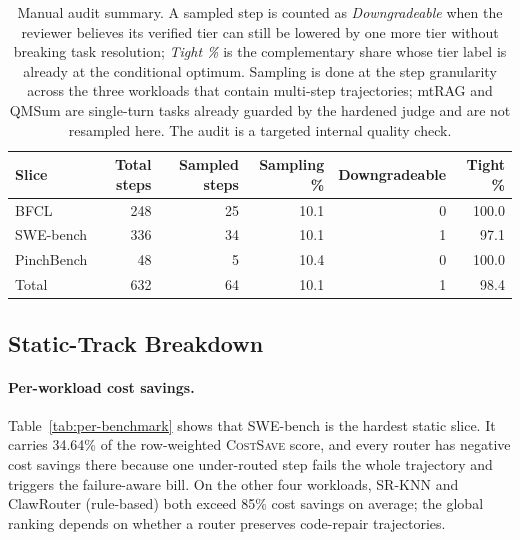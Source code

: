 \begin{table}[ht]
\centering
\small
\caption{Manual audit summary. A sampled step is counted as
\emph{Downgradeable} when the reviewer believes its verified tier can still
be lowered by one more tier without breaking task resolution; \emph{Tight \%}
is the complementary share whose tier label is already at the conditional
optimum. Sampling is done at the step granularity across the three workloads
that contain multi-step trajectories; mtRAG and QMSum are single-turn tasks
already guarded by the hardened judge and are not resampled here. The audit is a targeted internal quality check.}
\label{tab:manual-audit}
\begin{tabular}{lrrrrr}
\toprule
Slice & Total steps & Sampled steps & Sampling \% & Downgradeable & Tight \% \\
\midrule
BFCL & 248 & 25 & 10.1 & 0 & 100.0 \\
SWE-bench & 336 & 34 & 10.1 & 1 & 97.1 \\
PinchBench & 48 & 5 & 10.4 & 0 & 100.0 \\
\midrule
Total & 632 & 64 & 10.1 & 1 & 98.4 \\
\bottomrule
\end{tabular}
\end{table}

\subsection{Static-Track Breakdown}
\label{app:static-breakdown}

\paragraph{Per-workload cost savings.}

Table~\ref{tab:per-benchmark} shows that SWE-bench is the hardest static slice.
It carries 34.64\% of the row-weighted \textsc{CostSave} score, and every
router has negative cost savings there because one under-routed step fails the
whole trajectory and triggers the failure-aware bill. On the other four
workloads, SR-KNN and ClawRouter (rule-based) both exceed 85\% cost savings on average; the
global ranking depends on whether a router preserves code-repair trajectories.

